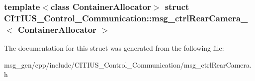 \subsubsection*{template$<$class Container\-Allocator$>$ struct C\-I\-T\-I\-U\-S\-\_\-\-Control\-\_\-\-Communication\-::msg\-\_\-ctrl\-Rear\-Camera\-\_\-$<$ Container\-Allocator $>$}



\-The documentation for this struct was generated from the following file\-:\begin{DoxyCompactItemize}
\item 
msg\-\_\-gen/cpp/include/\-C\-I\-T\-I\-U\-S\-\_\-\-Control\-\_\-\-Communication/msg\-\_\-ctrl\-Rear\-Camera.\-h\end{DoxyCompactItemize}
